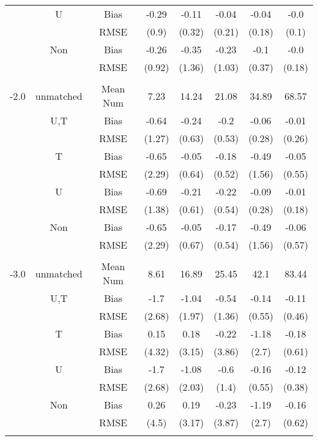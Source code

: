 \begin{tabular}{@{\extracolsep{5pt}}lc|cccccc}
 & U & Bias & -0.29 & -0.11 & -0.04 & -0.04 & -0.0 \\
 &  & RMSE & (0.9) & (0.32) & (0.21) & (0.18) & (0.1) \\
 & Non & Bias & -0.26 & -0.35 & -0.23 & -0.1 & -0.0 \\
 &  & RMSE & (0.92) & (1.36) & (1.03) & (0.37) & (0.18) \\
 &  &  &  &  &  &  &  \\
-2.0 & unmatched & Mean Num & 7.23 & 14.24 & 21.08 & 34.89 & 68.57 \\
 & U,T & Bias & -0.64 & -0.24 & -0.2 & -0.06 & -0.01 \\
 &  & RMSE & (1.27) & (0.63) & (0.53) & (0.28) & (0.26) \\
 & T & Bias & -0.65 & -0.05 & -0.18 & -0.49 & -0.05 \\
 &  & RMSE & (2.29) & (0.64) & (0.52) & (1.56) & (0.55) \\
 & U & Bias & -0.69 & -0.21 & -0.22 & -0.09 & -0.01 \\
 &  & RMSE & (1.38) & (0.61) & (0.54) & (0.28) & (0.18) \\
 & Non & Bias & -0.65 & -0.05 & -0.17 & -0.49 & -0.06 \\
 &  & RMSE & (2.29) & (0.67) & (0.54) & (1.56) & (0.57) \\
 &  &  &  &  &  &  &  \\
-3.0 & unmatched & Mean Num & 8.61 & 16.89 & 25.45 & 42.1 & 83.44 \\
 & U,T & Bias & -1.7 & -1.04 & -0.54 & -0.14 & -0.11 \\
 &  & RMSE & (2.68) & (1.97) & (1.36) & (0.55) & (0.46) \\
 & T & Bias & 0.15 & 0.18 & -0.22 & -1.18 & -0.18 \\
 &  & RMSE & (4.32) & (3.15) & (3.86) & (2.7) & (0.61) \\
 & U & Bias & -1.7 & -1.08 & -0.6 & -0.16 & -0.12 \\
 &  & RMSE & (2.68) & (2.03) & (1.4) & (0.55) & (0.38) \\
 & Non & Bias & 0.26 & 0.19 & -0.23 & -1.19 & -0.16 \\
 &  & RMSE & (4.5) & (3.17) & (3.87) & (2.7) & (0.62) \\
 &  &  &  &  &  &  &  \\
\hline 
\bottomrule 
\end{tabular}
